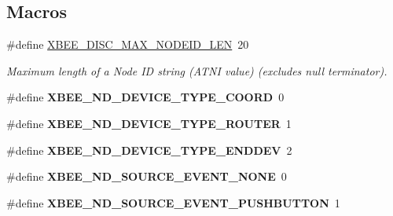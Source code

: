 \subsection*{Macros}
\begin{DoxyCompactItemize}
\item 
\hypertarget{group__xbee__discovery_ga0df6e63d6ccca22fcf154b6f0be46da6}{\#define \hyperlink{group__xbee__discovery_ga0df6e63d6ccca22fcf154b6f0be46da6}{X\-B\-E\-E\-\_\-\-D\-I\-S\-C\-\_\-\-M\-A\-X\-\_\-\-N\-O\-D\-E\-I\-D\-\_\-\-L\-E\-N}~20}\label{group__xbee__discovery_ga0df6e63d6ccca22fcf154b6f0be46da6}

\begin{DoxyCompactList}\small\item\em Maximum length of a Node I\-D string (A\-T\-N\-I value) (excludes null terminator). \end{DoxyCompactList}\item 
\hypertarget{group__xbee__discovery_gad01a0deb6da2cfa51bf893b93c33145b}{\#define {\bfseries X\-B\-E\-E\-\_\-\-N\-D\-\_\-\-D\-E\-V\-I\-C\-E\-\_\-\-T\-Y\-P\-E\-\_\-\-C\-O\-O\-R\-D}~0}\label{group__xbee__discovery_gad01a0deb6da2cfa51bf893b93c33145b}

\item 
\hypertarget{group__xbee__discovery_ga7b5f045986178759d39b922d9671ef58}{\#define {\bfseries X\-B\-E\-E\-\_\-\-N\-D\-\_\-\-D\-E\-V\-I\-C\-E\-\_\-\-T\-Y\-P\-E\-\_\-\-R\-O\-U\-T\-E\-R}~1}\label{group__xbee__discovery_ga7b5f045986178759d39b922d9671ef58}

\item 
\hypertarget{group__xbee__discovery_ga1d539a23a1b7f387256a706825b2ba01}{\#define {\bfseries X\-B\-E\-E\-\_\-\-N\-D\-\_\-\-D\-E\-V\-I\-C\-E\-\_\-\-T\-Y\-P\-E\-\_\-\-E\-N\-D\-D\-E\-V}~2}\label{group__xbee__discovery_ga1d539a23a1b7f387256a706825b2ba01}

\item 
\hypertarget{group__xbee__discovery_ga65247596c3705407f5f2eb73497ef5ca}{\#define {\bfseries X\-B\-E\-E\-\_\-\-N\-D\-\_\-\-S\-O\-U\-R\-C\-E\-\_\-\-E\-V\-E\-N\-T\-\_\-\-N\-O\-N\-E}~0}\label{group__xbee__discovery_ga65247596c3705407f5f2eb73497ef5ca}

\item 
\hypertarget{group__xbee__discovery_gafe8894115d7013fb820444fa2c77a12a}{\#define {\bfseries X\-B\-E\-E\-\_\-\-N\-D\-\_\-\-S\-O\-U\-R\-C\-E\-\_\-\-E\-V\-E\-N\-T\-\_\-\-P\-U\-S\-H\-B\-U\-T\-T\-O\-N}~1}\label{group__xbee__discovery_gafe8894115d7013fb820444fa2c77a12a}


\end{DoxyCompactItemize}
